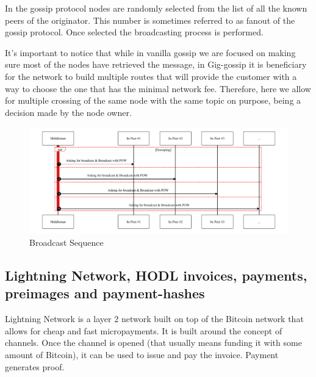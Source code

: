 \documentclass{article}
\begin{document}
In the gossip protocol nodes are randomly selected from the list of all the known peers of the originator. This number is sometimes referred to as fanout \cite{Fanout} of the gossip protocol. Once selected the broadcasting process is performed.

It's important to notice that while in vanilla gossip we are focused on making sure most of the nodes have retrieved the message, in Gig-gossip it is beneficiary for the network to build multiple routes that will provide the customer with a way to choose the one that has the minimal network fee. Therefore, here we allow for multiple crossing of the same node with the same topic on purpose, being a decision made by the node owner.

\begin{figure}
	\centering
	\includegraphics[scale=0.8]{BroadcastSequence.pdf}
	\caption{Broadcast Sequence}
	\label{fig:fr:broadcastsequence}
\end{figure}

\subsection{Lightning Network, HODL invoices, payments, preimages and payment-hashes}

Lightning Network is a layer 2 network built on top of the Bitcoin network that allows for cheap and fast micropayments.
It is built around the concept of channels. Once the channel is opened (that usually means funding it with some amount of Bitcoin), it can be used to issue and pay the invoice. Payment generates proof. 
\end{document}
